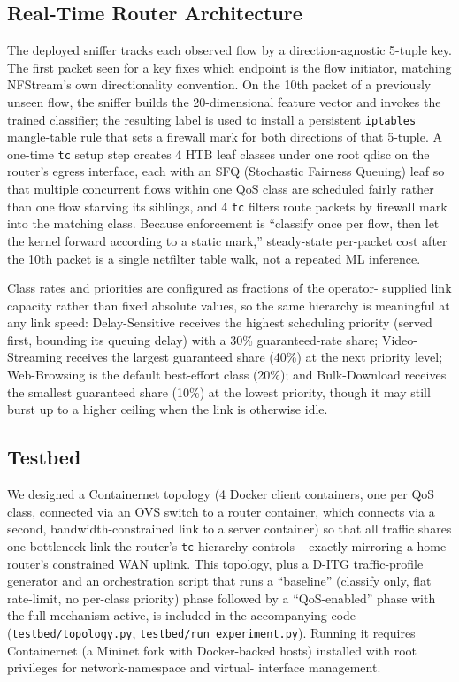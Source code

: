 \documentclass[10pt,twocolumn]{article}
\begin{document}
\subsection{Real-Time Router Architecture}

The deployed sniffer tracks each observed flow by a direction-agnostic 5-tuple key. The first
packet seen for a key fixes which endpoint is the flow initiator,
matching NFStream's own directionality convention. On the 10th packet of
a previously unseen flow, the sniffer builds the 20-dimensional feature
vector and invokes the trained classifier; the resulting label is used to
install a persistent \texttt{iptables} mangle-table rule that sets a
firewall mark for both directions of that 5-tuple. A one-time \texttt{tc}
setup step creates 4 HTB leaf classes under one root qdisc on the
router's egress interface, each with an SFQ (Stochastic Fairness Queuing)
leaf so that multiple concurrent flows within one QoS class are scheduled
fairly rather than one flow starving its siblings, and 4 \texttt{tc}
filters route packets by firewall mark into the matching class. Because
enforcement is ``classify once per flow, then let the kernel forward
according to a static mark,'' steady-state per-packet cost after the
10th packet is a single netfilter table walk, not a repeated ML
inference.

Class rates and priorities are configured as fractions of the operator-
supplied link capacity rather than fixed absolute values, so the same
hierarchy is meaningful at any link speed: Delay-Sensitive receives the
highest scheduling priority (served first, bounding its queuing delay)
with a 30\% guaranteed-rate share; Video-Streaming receives the largest
guaranteed share (40\%) at the next priority level; Web-Browsing is the
default best-effort class (20\%); and Bulk-Download receives the smallest
guaranteed share (10\%) at the lowest priority, though it may still burst
up to a higher ceiling when the link is otherwise idle.

\subsection{Testbed}

We designed a Containernet topology (4 Docker client containers, one per
QoS class, connected via an OVS switch to a router container, which
connects via a second, bandwidth-constrained link to a server container)
so that all traffic shares one bottleneck link the router's \texttt{tc}
hierarchy controls -- exactly mirroring a home router's constrained WAN
uplink. This topology, plus a D-ITG traffic-profile generator and an
orchestration script that runs a ``baseline'' (classify only, flat
rate-limit, no per-class priority) phase followed by a ``QoS-enabled''
phase with the full mechanism active, is included in the accompanying
code (\texttt{testbed/topology.py}, \texttt{testbed/run\_experiment.py}).
Running it requires Containernet (a Mininet fork with Docker-backed
hosts) installed with root privileges for network-namespace and virtual-
interface management.
\end{document}
